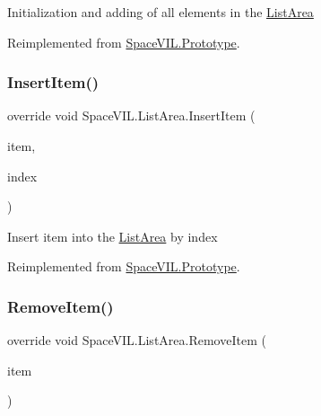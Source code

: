 Initialization and adding of all elements in the \mbox{\hyperlink{class_space_v_i_l_1_1_list_area}{List\+Area}} 



Reimplemented from \mbox{\hyperlink{class_space_v_i_l_1_1_prototype_ac3379fe02923ee155b5b0084abf27420}{Space\+V\+I\+L.\+Prototype}}.

\mbox{\label{class_space_v_i_l_1_1_list_area_a44efda800a4a280b7a452bd09c90f484}} 
\subsubsection{\texorpdfstring{Insert\+Item()}{InsertItem()}}
{\footnotesize\ttfamily override void Space\+V\+I\+L.\+List\+Area.\+Insert\+Item (\begin{DoxyParamCaption}\item[{\mbox{\hyperlink{interface_space_v_i_l_1_1_core_1_1_i_base_item}{I\+Base\+Item}}}]{item,  }\item[{Int32}]{index }\end{DoxyParamCaption})\hspace{0.3cm}{\ttfamily [virtual]}}



Insert item into the \mbox{\hyperlink{class_space_v_i_l_1_1_list_area}{List\+Area}} by index 



Reimplemented from \mbox{\hyperlink{class_space_v_i_l_1_1_prototype_a9dd004dfa4ca2ea37c21770a24434270}{Space\+V\+I\+L.\+Prototype}}.

\mbox{\label{class_space_v_i_l_1_1_list_area_a0020756686088a62a43388973fa2d7bf}} 
\subsubsection{\texorpdfstring{Remove\+Item()}{RemoveItem()}}
{\footnotesize\ttfamily override void Space\+V\+I\+L.\+List\+Area.\+Remove\+Item (\begin{DoxyParamCaption}\item[{\mbox{\hyperlink{interface_space_v_i_l_1_1_core_1_1_i_base_item}{I\+Base\+Item}}}]{item }\end{DoxyParamCaption})\hspace{0.3cm}{\ttfamily [virtual]}}



